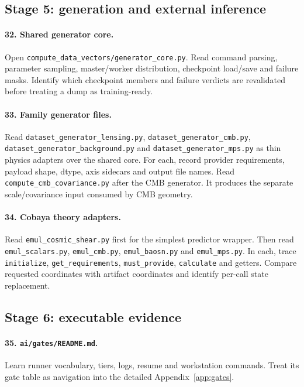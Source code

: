 \documentclass[10pt,aps,prd,twocolumn,nofootinbib]{revtex4-2}
\newcommand{\code}[1]{\texttt{#1}}
\begin{document}
\subsection{Stage 5: generation and external inference}

\paragraph{32.  Shared generator core.}
Open \code{compute\_data\_vectors/generator\_core.py}.  Read command parsing,
parameter sampling, master/worker distribution,
checkpoint load/save and failure masks.  Identify which checkpoint members
and failure verdicts are revalidated before treating a dump as training-ready.

\paragraph{33.  Family generator files.}
Read \code{dataset\_generator\_lensing.py},
\code{dataset\_generator\_cmb.py},
\code{dataset\_generator\_background.py} and
\code{dataset\_generator\_mps.py} as thin physics adapters over the shared
core.  For each, record provider requirements, payload shape, dtype, axis
sidecars and output file names.  Read
\code{compute\_cmb\_covariance.py} after the CMB generator.  It produces the
separate scale/covariance input consumed by CMB geometry.

\paragraph{34.  Cobaya theory adapters.}
Read \code{emul\_cosmic\_shear.py} first for the simplest predictor wrapper.
Then read \code{emul\_scalars.py}, \code{emul\_cmb.py},
\code{emul\_baosn.py} and \code{emul\_mps.py}.  In each, trace
\code{initialize}, \code{get\_requirements}, \code{must\_provide},
\code{calculate} and getters.  Compare requested coordinates with artifact
coordinates and identify per-call state replacement.

\subsection{Stage 6: executable evidence}

\paragraph{35.  \code{ai/gates/README.md}.}
Learn runner vocabulary, tiers, logs, resume and workstation commands.  Treat
its gate table as navigation into the detailed Appendix~\ref{app:gates}.
\end{document}
